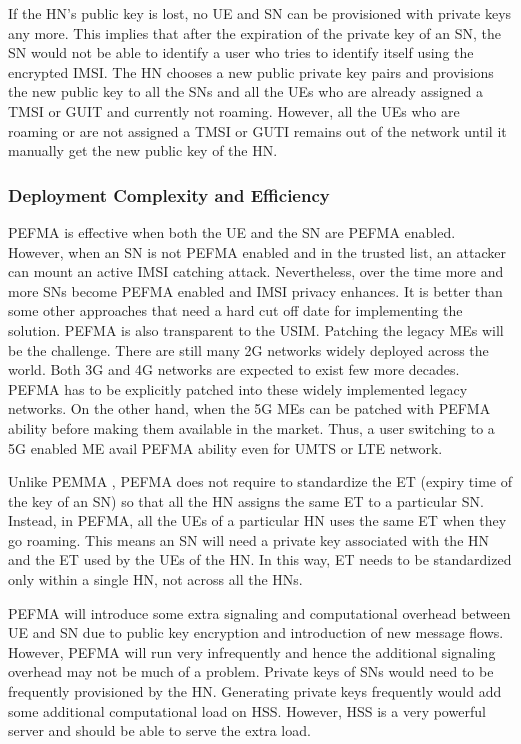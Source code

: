 \documentclass{river-journal}
\begin{document}
If the HN's public key is lost, no UE and SN can be provisioned with private keys any more. This implies that after the expiration of the private key of an SN, the SN would not be able to identify a user who tries to identify itself using the encrypted IMSI. The HN chooses a new public private key pairs and provisions the new public key to all the SNs and all the UEs who are already assigned a TMSI or GUIT and currently not roaming. However, all the UEs who are roaming or are not assigned a TMSI or GUTI remains out of the network until it manually get the new public key of the HN.

\subsubsection{Deployment Complexity and Efficiency}
PEFMA is effective when both the UE and the SN are PEFMA enabled. However, when an SN is not PEFMA enabled and in the trusted list, an attacker can mount an active IMSI catching attack. Nevertheless, over the time more and more SNs become PEFMA enabled and IMSI privacy enhances. It is better than some other approaches that need a hard cut off date for implementing the solution. PEFMA is also transparent to the USIM. Patching the legacy MEs will be the challenge. There are still many 2G networks widely deployed across the world. Both 3G and 4G networks are expected to exist few more decades. PEFMA has to be explicitly patched into these widely implemented legacy networks. On the other hand, when the 5G MEs can be patched with PEFMA ability before making them available in the market. Thus, a user switching to a 5G enabled ME avail PEFMA ability even for UMTS or LTE network. 

Unlike PEMMA \cite{koienibe}, PEFMA does not require to standardize the ET (expiry time of the key of an SN) so that all the HN assigns the same ET to a particular SN. Instead, in PEFMA, all the UEs of a particular HN uses the same ET when they go roaming. This means an SN will need a private key associated with the HN and the ET used by the UEs of the HN. In this way, ET needs to be standardized only within a single HN, not across all the HNs.

PEFMA will introduce some extra signaling and computational overhead between UE and SN due to public key encryption and introduction of new message flows. However, PEFMA will run very infrequently and hence the additional signaling overhead may not be much of a problem. Private keys of SNs would need to be frequently provisioned by the HN. Generating private keys frequently would add some additional computational load on HSS. However, HSS is a very powerful server and should be able to serve the extra load.
\end{document}
